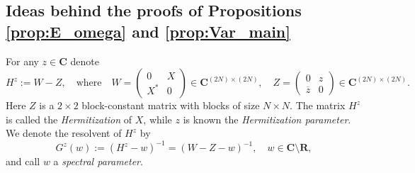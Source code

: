 \documentclass[10pt]{amsart}
\numberwithin{equation}{section}
\newcommand{\R}{\mathbf{R}}
\newcommand{\C}{\mathbf{C}}
\newcommand{\X}{\mathcal{X}}
\begin{document}
\subsection{Ideas behind the proofs of Propositions \ref{prop:E_omega} and \ref{prop:Var_main}}\label{sec:results_list} For any $z\in\C$ denote
\begin{equation}
H^z:=W-Z,\quad \text{where}\quad 
W=\begin{pmatrix}
0&X\\X^*&0
\end{pmatrix}\in \C^{(2N)\times(2N)},\quad
Z=\begin{pmatrix}
0&z\\\overline{z}&0
\end{pmatrix}\in \C^{(2N)\times(2N)}.
\label{eq:def_hermitization}
\end{equation}
Here $Z$ is a $2\times 2$ block-constant matrix with blocks of size $N\times N$. The matrix $H^z$ is called the \emph{Hermitization} of $X$, while $z$ is known the \emph{Hermitization parameter}. We denote the resolvent of $H^z$ by
\begin{equation}
G^z(w):=(H^z-w)^{-1}=(W-Z-w)^{-1},\quad w\in \C\setminus\R,
\label{eq:def_resolvent}
\end{equation}
and call $w$ a \emph{spectral parameter}.
\end{document}
